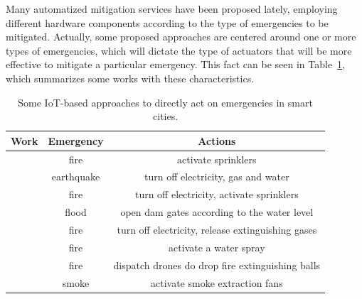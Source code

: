 \begin{refsection}
Many automatized mitigation services have been proposed lately, employing different hardware components according to the type of emergencies to be mitigated. Actually, some proposed approaches are centered around one or more types of emergencies, which will dictate the type of actuators that will be more effective to mitigate a particular emergency. This fact can be seen in Table~\ref{Tab:mitigation}, which summarizes some works with these characteristics. 

\begin{table}
    \centering
    \caption{Some IoT-based approaches to directly act on emergencies in smart cities.}
    \label{Tab:mitigation}
    \begin{tabular}{|c|c|c|}
        
        \hline
        \textbf{Work} & \textbf{Emergency} & \textbf{Actions} \\
        
        \hline
        \citeauthor{mitigationAct1} \cite{mitigationAct1} & fire       & activate sprinklers \\

        \hline
        \citeauthor{iotEarthquake2} \cite{iotEarthquake2} & earthquake & turn off electricity, gas and water \\

        \hline
        \citeauthor{SultanMahmud2017} \cite{SultanMahmud2017} & fire   & turn off electricity, activate sprinklers \\

        \hline
        \citeauthor{iotFlood2} \cite{iotFlood2} & flood & open dam gates according to the water level \\
        
        \hline
        \citeauthor{mitigationAct3} \cite{mitigationAct3} & fire       & turn off electricity, release extinguishing gases \\

        \hline
        \citeauthor{mitigationAct4} \cite{mitigationAct4} & fire       & activate a water spray \\

        \hline
        \citeauthor{mitigationurban7} \cite{mitigationurban7} & fire       & dispatch drones do drop fire extinguishing balls \\

        \hline
        \citeauthor{mitigationAct6} \cite{mitigationAct6} & smoke       & activate smoke extraction fans \\


\end{tabular}
\end{table}
\end{refsection}
